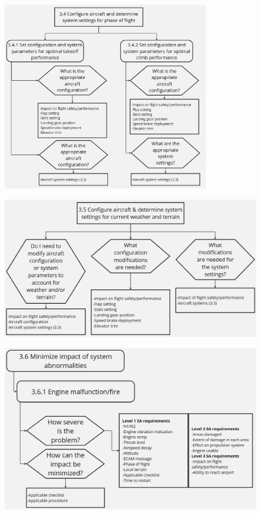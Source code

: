\documentclass[12pt,a4paper]{article} %
\begin{document}
	\begin{figure}[H]
		\centering
		\includegraphics[width=0.8\textwidth]{./images/GDTA/bott-goal-9.jpg}
		\label{gdta:bott-9}
	\end{figure}

	\begin{figure}[H]
		\centering
		\includegraphics[width=1.0\textwidth]{./images/GDTA/bott-goal-10.jpg}
		\label{gdta:bott-10}
	\end{figure}

	\begin{figure}[H]
		\centering
		\includegraphics[width=1.0\textwidth]{./images/GDTA/bott-goal-11.jpg}
		\label{gdta:bott-11}
	\end{figure}
\end{document}
